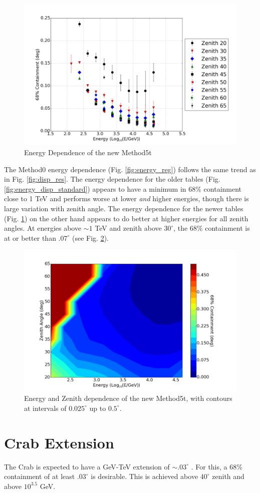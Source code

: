 \documentclass[main.tex]{subfiles}
\begin{document}
\begin{figure}[htbp]
  \centering
  \includegraphics[width=.9\linewidth]{images/disp_450_energy}
  \caption{Energy Dependence of the new Method5t}
  \label{fig:energy_disp_450}    
\end{figure}

The Method0 energy dependence (Fig. \ref{fig:energy_reg}) follows the same trend as in Fig. \ref{fig:disp_res}. The energy dependence for the older \disp tables (Fig. \ref{fig:energy_disp_standard}) appears to have a minimum in 68\% containment close to 1 TeV and performs worse at lower \textit{and} higher energies, though there is large variation with zenith angle. The energy dependence for the newer \disp tables (Fig. \ref{fig:energy_disp_450}) on the other hand appears to do better at higher energies for all zenith angles. At energies above $\sim 1$ TeV and zenith above $30^\circ$, the 68\% containment is at or better than $.07^\circ$ (see Fig. \ref{fig:energy_contour}).

\begin{figure}[htbp]
  \centering
  \includegraphics[width=.9\linewidth]{images/disp_450size_contour}
  \caption{Energy and Zenith dependence of the new Method5t, with contours at intervals of $0.025^\circ$ up to $0.5^\circ$.}
  \label{fig:energy_contour}
\end{figure}


\section{Crab Extension}

The Crab is expected to have a GeV-TeV extension of $\sim .03^\circ$ \cite{Fermi_LAT_Crab_extension} \cite{HESS_Crab_extension}. For this, a 68\% containment of at least $.03^\circ$ is desirable. This is achieved above $40^\circ$ zenith and above $10^{3.5}$ GeV.
\end{document}
